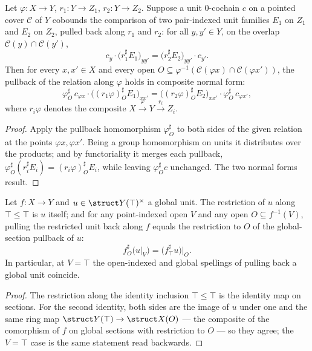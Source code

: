 \begin{lemma}
  \label{lem:unitsAppLE_coboundary_rel}
  \leanok
  Let \(\varphi \colon X \to Y\), \(r_1 \colon Y \to Z_1\), \(r_2 \colon Y \to Z_2\). Suppose a
  unit \(0\)-cochain \(c\) on a pointed cover \(\mathcal C\) of \(Y\) cobounds the comparison of
  two pair-indexed unit families \(E_1\) on \(Z_1\) and \(E_2\) on \(Z_2\), pulled back along
  \(r_1\) and \(r_2\): for all \(y, y' \in Y\), on the overlap
  \(\mathcal C(y) \cap \mathcal C(y')\),
  \[
    c_y \cdot \bigl(r_1^{\sharp} E_1\bigr)_{y y'}
      = \bigl(r_2^{\sharp} E_2\bigr)_{y y'} \cdot c_{y'} .
  \]
  Then for every \(x, x' \in X\) and every open \(O \subseteq \varphi^{-1}(\mathcal C(\varphi x)
  \cap \mathcal C(\varphi x'))\), the pullback of the relation along \(\varphi\) holds in
  composite normal form:
  \[
    \varphi^{\sharp}_O\, c_{\varphi x} \cdot \bigl((r_1\varphi)^{\sharp}_O E_1\bigr)_{x x'}
      = \bigl((r_2\varphi)^{\sharp}_O E_2\bigr)_{x x'} \cdot \varphi^{\sharp}_O\, c_{\varphi x'},
  \]
  where \(r_i\varphi\) denotes the composite \(X \xrightarrow{\varphi} Y \xrightarrow{r_i} Z_i\).
\end{lemma}
\begin{proof}
  \leanok
  Apply the pullback homomorphism \(\varphi^{\sharp}_O\) to both sides of the given relation at
  the points \(\varphi x, \varphi x'\). Being a group homomorphism on units it distributes over
  the products; and by functoriality it merges each pullback,
  \(\varphi^{\sharp}_O(r_i^{\sharp} E_i) = (r_i\varphi)^{\sharp}_O E_i\), while leaving
  \(\varphi^{\sharp}_O c\) unchanged. The two normal forms result.
\end{proof}

\begin{lemma}
  \label{lem:global_unit_pullback}
  \leanok
  Let \(f \colon X \to Y\) and \(u \in \struct Y(\top)^{\times}\) a global unit. The restriction
  of \(u\) along \(\top \le \top\) is \(u\) itself; and for any point-indexed open \(V\) and any
  open \(O \subseteq f^{-1}(V)\), pulling the restricted unit back along \(f\) equals the
  restriction to \(O\) of the global-section pullback of \(u\):
  \[
    f^{\sharp}_O\bigl(u|_V\bigr) = \bigl(f^{\sharp}_\top u\bigr)\big|_O .
  \]
  In particular, at \(V = \top\) the open-indexed and global spellings of pulling back a global
  unit coincide.
\end{lemma}
\begin{proof}
  \leanok
  The restriction along the identity inclusion \(\top \le \top\) is the identity map on
  sections. For the second identity, both sides are the image of \(u\) under one and the same
  ring map \(\struct Y(\top) \to \struct X(O)\) — the composite of the comorphism of \(f\) on
  global sections with restriction to \(O\) — so they agree; the \(V = \top\) case is the same
  statement read backwards.
\end{proof}

